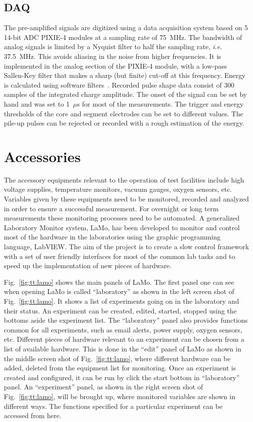 \subsection{DAQ} 
\label{sec:tt:daq}
The pre-amplified signals are digitized using a data acquisition system based on 5 14-bit ADC PIXIE-4 modules at a sampling rate of 75~MHz. The bandwidth of analog signals is limited by a Nyquist filter to half the sampling rate, \textit{i.e.} 37.5~MHz. This avoids aliasing in the noise from higher frequencies. It is implemented in the analog section of the PIXIE-4 module, with a low-pass Sallen-Key filter that makes a sharp (but finite) cut-off at this frequency. Energy is calculated using software filters~\cite{Pixie4}. Recorded pulse shape data consist of 300 samples of the integrated charge amplitude. The onset of the signal can be set by hand and was set to 1~$\mu$s for most of the measurements. The trigger and energy thresholds of the core and segment electrodes can be set to different values. The pile-up pulses can be rejected or recorded with a rough estimation of the energy.

\section{Accessories} 
\label{sec:tt:lamo}
The accessory equipments relevant to the operation of test facilities include high voltage supplies, temperature monitors, vacuum gauges, oxygen sensors, etc. Variables given by these equipments need to be monitored, recorded and analyzed in order to ensure a successful measurement. For overnight or long term measurements these monitoring processes need to be automated. A generalized Laboratory Monitor system, LaMo, has been developed to monitor and control most of the hardware in the laboratories using the graphic programming language, LabVIEW. The aim of the project is to create a slow control framework with a set of user friendly interfaces for most of the common lab tasks and to speed up the implementation of new pieces of hardware.

Fig.~\ref{fig:tt:lamo} shows the main panels of LaMo. The first panel one can see when opening LaMo is called ``laboratory'' as shown in the left screen shot of Fig.~\ref{fig:tt:lamo}. It shows a list of experiments going on in the laboratory and their status. An experiment can be created, edited, started, stopped using the bottoms aside the experiment list. The ``laboratory'' panel also provides functions common for all experiments, such as email alerts, power supply, oxygen sensors, etc. Different pieces of hardware relevant to an experiment can be chosen from a list of available hardware. This is done in the ``edit'' panel of LaMo as shown in the middle screen shot of Fig.~\ref{fig:tt:lamo}, where different hardware can be added, deleted from the equipment list for monitoring. Once an experiment is created and configured, it can be run by click the start bottom in ``laboratory'' panel. An ``experiment'' panel, as shown in the right screen shot of Fig.~\ref{fig:tt:lamo}, will be brought up, where monitored variables are shown in different ways. The functions specified for a particular experiment can be accessed from here.


